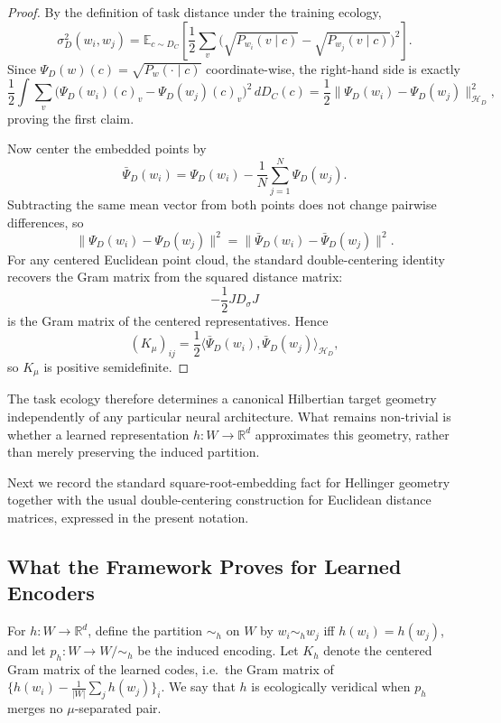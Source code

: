 \documentclass[twoside,11pt]{article}
\newcommand{\sigmasq}{\sigma^2}
\newcommand{\E}{\mathbb{E}}
\newcommand{\R}{\mathbb{R}}
\begin{document}
\begin{proof}
By the definition of task distance under the training ecology,
\[
\sigmasq_D(w_i,w_j)
= \E_{c\sim D_C}\!\left[\frac12\sum_v
\bigl(\sqrt{P_{w_i}(v\mid c)}-\sqrt{P_{w_j}(v\mid c)}\bigr)^2\right].
\]
Since $\Psi_D(w)(c)=\sqrt{P_w(\cdot\mid c)}$ coordinate-wise, the right-hand side is exactly
\[
\frac12\int \sum_v
\bigl(\Psi_D(w_i)(c)_v-\Psi_D(w_j)(c)_v\bigr)^2\,dD_C(c)
= \frac12\|\Psi_D(w_i)-\Psi_D(w_j)\|_{\mathcal H_D}^2,
\]
proving the first claim.

Now center the embedded points by
\[
\bar{\Psi}_D(w_i)=\Psi_D(w_i)-\frac1N\sum_{j=1}^N \Psi_D(w_j).
\]
Subtracting the same mean vector from both points does not change pairwise differences, so
\[
\|\Psi_D(w_i)-\Psi_D(w_j)\|^2
= \|\bar{\Psi}_D(w_i)-\bar{\Psi}_D(w_j)\|^2.
\]
For any centered Euclidean point cloud, the standard double-centering identity recovers the Gram matrix from the squared distance matrix:
\[
-\frac12 JD_\sigma J
\]
is the Gram matrix of the centered representatives. Hence
\[
(K_\mu)_{ij}
= \frac12\langle \bar{\Psi}_D(w_i),\bar{\Psi}_D(w_j)\rangle_{\mathcal H_D},
\]
so $K_\mu$ is positive semidefinite.
\end{proof}

The task ecology therefore determines a canonical Hilbertian target geometry independently of any particular neural architecture. What remains non-trivial is whether a learned representation $h \colon W \to \R^d$ approximates this geometry, rather than merely preserving the induced partition.

Next we record the standard square-root-embedding fact for Hellinger geometry together with the usual double-centering construction for Euclidean distance matrices, expressed in the present notation.

\subsection{What the Framework Proves for Learned Encoders}

\begin{definition}
For $h \colon W \to \R^d$, define the partition ${\sim_h}$ on $W$ by $w_i \sim_h w_j$ iff $h(w_i) = h(w_j)$, and let $p_h \colon W \to W/{\sim_h}$ be the induced encoding. Let $K_h$ denote the centered Gram matrix of the learned codes, i.e.\ the Gram matrix of $\{h(w_i)-\frac{1}{|W|}\sum_j h(w_j)\}_i$. We say that $h$ is ecologically veridical when $p_h$ merges no $\mu$-separated pair.
\end{definition}
\end{document}
